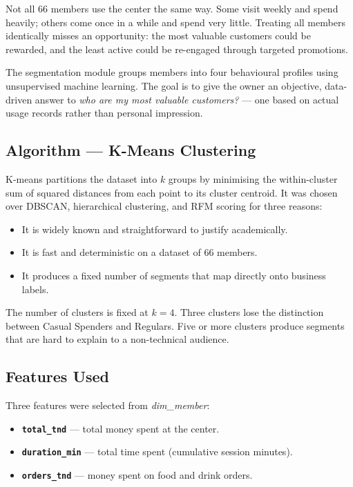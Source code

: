 Not all 66 members use the center the same way. Some visit weekly and spend heavily;
others come once in a while and spend very little. Treating all members identically
misses an opportunity: the most valuable customers could be rewarded, and the least
active could be re-engaged through targeted promotions.

The segmentation module groups members into four behavioural profiles using unsupervised
machine learning. The goal is to give the owner an objective, data-driven answer to
\textit{who are my most valuable customers?} --- one based on actual usage records
rather than personal impression.

\subsection{Algorithm --- K-Means Clustering}

K-means partitions the dataset into $k$ groups by minimising the within-cluster sum of
squared distances from each point to its cluster centroid. It was chosen over DBSCAN,
hierarchical clustering, and RFM scoring for three reasons:

\begin{itemize}[noitemsep]
  \item It is widely known and straightforward to justify academically.
  \item It is fast and deterministic on a dataset of 66 members.
  \item It produces a fixed number of segments that map directly onto business labels.
\end{itemize}

The number of clusters is fixed at $k=4$. Three clusters lose the distinction between
Casual Spenders and Regulars. Five or more clusters produce segments that are hard to
explain to a non-technical audience.

\subsection{Features Used}

Three features were selected from \textit{dim\_member}:

\begin{itemize}[noitemsep]
  \item \textbf{\texttt{total\_tnd}} --- total money spent at the center.
  \item \textbf{\texttt{duration\_min}} --- total time spent (cumulative session
        minutes).
  \item \textbf{\texttt{orders\_tnd}} --- money spent on food and drink orders.
\end{itemize}

